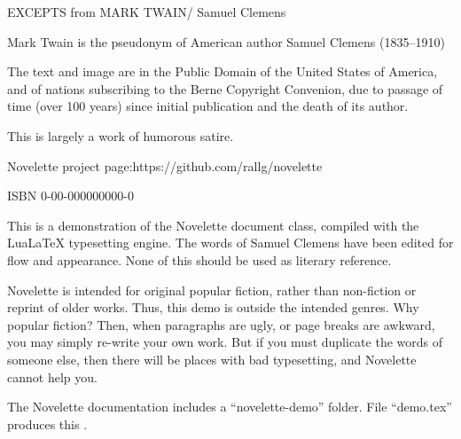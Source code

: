 \documentclass[../demo.tex]{novelettesubdoc}
\begin{document}
\begin{fullpage} %
\null\null\null\null\null %
\null\null\null %
\vfill %
\end{fullpage}

\begin{copyrightpage}
\vfill %
EXCEPTS from MARK TWAIN\br/ Samuel Clemens\par
Mark Twain is the pseudonym of American\br
author Samuel Clemens (1835--1910)\par
The text and image are in the Public Domain\br
of the United States of America, and of nations\br
subscribing to the Berne Copyright Convenion,\br
due to passage of time (over 100 years) since\br
initial publication and the death of its author.\par
This is largely a work of humorous satire.\par
Novelette project page:\br https://github.com/rallg/novelette\par
ISBN 0-00-000000000-0\par
\end{copyrightpage}


\begin{fullpage} %
\begin{upperpage}
\null\null\null\null %
\null\null %
\end{upperpage}
\begin{blockindent}[2,2]
This is a demonstration of the Novelette document
class, compiled with the LuaLaTeX typesetting engine.
The words of Samuel Clemens have been edited for flow and appearance.
None of this should be used as literary reference.\par
\forceindent Novelette is intended for original popular fiction, rather than
non-fiction or reprint of older works. Thus, this demo is outside the intended
genres. Why  popular fiction? Then, when paragraphs are ugly,
or page breaks are awkward, you may simply re-write your own work.
But if you must duplicate the words of someone else, then there will be places
with bad typesetting, and Novelette cannot help you.\par 
\forceindent The Novelette documentation includes a ``novelette-demo'' folder.
File ``demo.tex'' produces this .\par
\end{blockindent}
\end{fullpage}


\blankpage %
\end{document}
